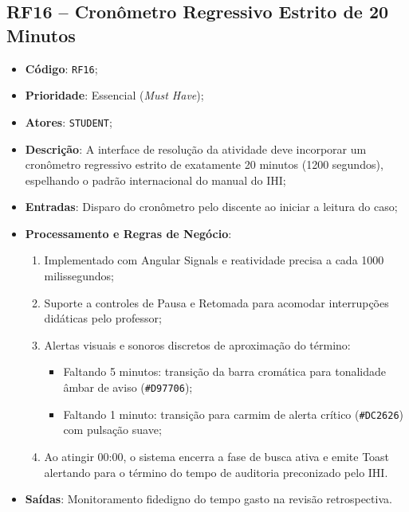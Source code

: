 \subsection{RF16 -- Cronômetro Regressivo Estrito de 20 Minutos}
\begin{itemize}
    \item \textbf{Código}: \texttt{RF16};
    \item \textbf{Prioridade}: Essencial (\textit{Must Have});
    \item \textbf{Atores}: \texttt{STUDENT};
    \item \textbf{Descrição}: A interface de resolução da atividade deve incorporar um cronômetro regressivo estrito de exatamente 20 minutos (1200 segundos), espelhando o padrão internacional do manual do IHI;
    \item \textbf{Entradas}: Disparo do cronômetro pelo discente ao iniciar a leitura do caso;
    \item \textbf{Processamento e Regras de Negócio}:
    \begin{enumerate}
        \item Implementado com Angular Signals e reatividade precisa a cada 1000 milissegundos;
        \item Suporte a controles de Pausa e Retomada para acomodar interrupções didáticas pelo professor;
        \item Alertas visuais e sonoros discretos de aproximação do término:
        \begin{itemize}
            \item Faltando 5 minutos: transição da barra cromática para tonalidade âmbar de aviso (\texttt{\#D97706});
            \item Faltando 1 minuto: transição para carmim de alerta crítico (\texttt{\#DC2626}) com pulsação suave;
        \end{itemize}
        \item Ao atingir 00:00, o sistema encerra a fase de busca ativa e emite Toast alertando para o término do tempo de auditoria preconizado pelo IHI.
    \end{enumerate}
    \item \textbf{Saídas}: Monitoramento fidedigno do tempo gasto na revisão retrospectiva.
\end{itemize}

